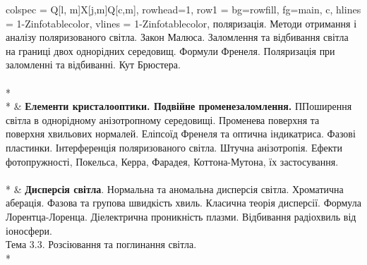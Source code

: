 \documentclass{Syllabus}
\begin{document}
\begin{longtblr}[]{
    colspec = {Q[l, m]X[j,m]Q[c,m]},
    rowhead=1,
    row{1} = {bg=rowfill, fg=main,  c},
    hlines = {1-Z}{infotablecolor},
    vlines = {1-Z}{infotablecolor},
    }
    поляризація. Методи отримання і аналізу поляризованого світла. Закон Малюса.
    Заломлення та відбивання світла на границі двох однорідних середовищ. Формули
    Френеля. Поляризація при заломленні та відбиванні. Кут Брюстера.
    \\
                                                                                                                                                                                                                                  \\* %
                                                                                                                                                                                                                       \\* %
     & \textbf{Елементи кристалооптики. Подвійне променезаломлення.} ППоширення світла в однорідному анізотропному середовищі. Променева поверхня та поверхня хвильових нормалей. Еліпсоїд Френеля та оптична індикатриса. Фазові пластинки. Інтерференція поляризованого світла. Штучна анізотропія. Ефекти
    фотопружності, Покельса, Керра, Фарадея, Коттона-Мутона, їх застосування.
    \vspace*{4ex}
    \\
                                                                                                                                                                                                                                \\* %
     & \textbf{Дисперсія світла}. Нормальна та аномальна дисперсія світла. Хроматична аберація. Фазова та групова
    швидкість хвиль. Класична теорія дисперсії. Формула Лорентца-Лоренца. Діелектрична
    проникність плазми. Відбивання радіохвиль від іоносфери.
    \\
     {Тема 3.3. Розсіювання та поглинання світла.}                                                                                                                                                                                                           \\* %

\end{longtblr}
\end{document}
